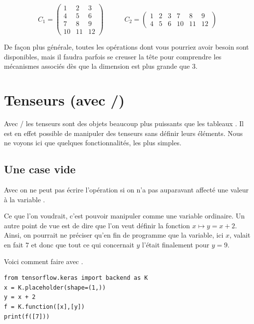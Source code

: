 \documentclass[11pt,class=report,crop=false]{standalone}
\begin{document}
$$C_1 = \begin{pmatrix}
 1 & 2 & 3 \\
 4 & 5 & 6 \\
 7 & 8 & 9 \\
10 & 11 & 12
\end{pmatrix}
\qquad\quad
C_2 = \begin{pmatrix}
 1 & 2 & 3 & 7 & 8 & 9 \\
 4 & 5 & 6 & 10 & 11 & 12
\end{pmatrix}
$$

\bigskip

De façon plus générale, toutes les opérations dont vous pourriez avoir besoin sont disponibles, mais il faudra parfois se creuser la tête pour comprendre les mécanismes associés dès que la dimension est plus grande que $3$.


\section{Tenseurs (avec \tensorflow/\keras)}

Avec \tensorflow/\keras{} les tenseurs sont des objets beaucoup plus puissants que les tableaux \numpy. Il est en effet possible de manipuler des tenseurs sans définir leurs éléments. 
Nous ne voyons ici que quelques fonctionnalités, les plus simples.

\subsection{Une case vide}

Avec \Python{} on ne peut pas écrire l'opération
si on n'a pas auparavant affecté une valeur à la variable .

Ce que l'on voudrait, c'est pouvoir manipuler  comme une variable ordinaire. Un autre point de vue est de dire que l'on veut définir la fonction $x \mapsto y = x+2$. Ainsi, on pourrait ne préciser qu'en fin de programme que la variable, ici $x$, valait en fait $7$ et donc que tout ce qui concernait $y$ l'était finalement pour $y=9$.

Voici comment faire avec \keras.

\begin{lstlisting}
from tensorflow.keras import backend as K
x = K.placeholder(shape=(1,))
y = x + 2 
f = K.function([x],[y])
print(f([7]))
\end{lstlisting}
\end{document}
